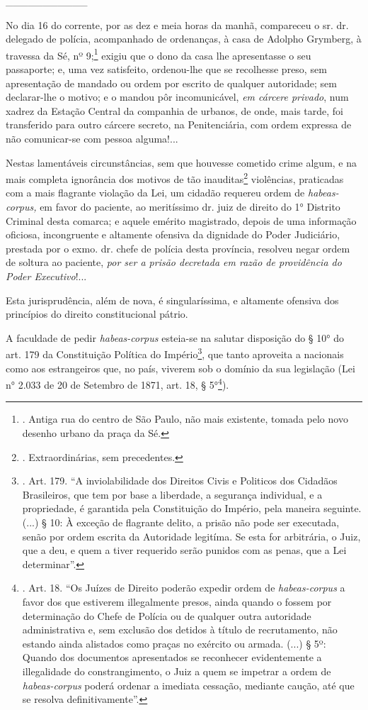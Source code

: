 \_\_\_\_\_\_\_\_\_\_\_

No dia 16 do corrente, por as dez e meia horas da manhã, compareceu o
sr. dr. delegado de polícia, acompanhado de ordenanças, à casa de
Adolpho Grymberg, à travessa da Sé, nº 9;\footnote{. Antiga rua do
  centro de São Paulo, não mais existente, tomada pelo novo desenho
  urbano da praça da Sé.} exigiu que o dono da casa lhe apresentasse o
seu passaporte; e, uma vez satisfeito, ordenou-lhe que se recolhesse
preso, sem apresentação de mandado ou ordem por escrito de qualquer
autoridade; sem declarar-lhe o motivo; e o mandou pôr incomunicável,
\emph{em cárcere privado}, num xadrez da Estação Central da companhia de
urbanos, de onde, mais tarde, foi transferido para outro cárcere
secreto, na Penitenciária, com ordem expressa de não comunicar-se com
pessoa alguma!...

Nestas lamentáveis circunstâncias, sem que houvesse cometido crime
algum, e na mais completa ignorância dos motivos de tão
inauditas\footnote{. Extraordinárias, sem precedentes.} violências,
praticadas com a mais flagrante violação da Lei, um cidadão requereu
ordem de \emph{habeas-corpus,} em favor do paciente, ao meritíssimo dr.
juiz de direito do 1° Distrito Criminal desta comarca; e aquele emérito
magistrado, depois de uma informação oficiosa, incongruente e altamente
ofensiva da dignidade do Poder Judiciário, prestada por o exmo. dr.
chefe de polícia desta província, resolveu negar ordem de soltura ao
paciente, \emph{por ser a prisão decretada em razão de providência do
Poder Executivo}!...

Esta jurisprudência, além de nova, é singularíssima, e altamente
ofensiva dos princípios do direito constitucional pátrio.

A faculdade de pedir \emph{habeas-corpus} esteia-se na salutar
disposição do § 10° do art. 179 da Constituição Política do
Império\footnote{. Art. 179. ``A inviolabilidade dos Direitos Civis e
  Politicos dos Cidadãos Brasileiros, que tem por base a liberdade, a
  segurança individual, e a propriedade, é garantida pela Constituição
  do Império, pela maneira seguinte. (...) § 10: À exceção de flagrante
  delito, a prisão não pode ser executada, senão por ordem escrita da
  Autoridade legitíma. Se esta for arbitrária, o Juiz, que a deu, e quem
  a tiver requerido serão punidos com as penas, que a Lei determinar''.},
que tanto aproveita a nacionais como aos estrangeiros que, no país,
viverem sob o domínio da sua legislação (Lei n° 2.033 de 20 de Setembro
de 1871, art. 18, § 5°\footnote{. Art. 18. ``Os Juízes de Direito
  poderão expedir ordem de \emph{habeas-corpus} a favor dos que
  estiverem illegalmente presos, ainda quando o fossem por determinação
  do Chefe de Polícia ou de qualquer outra autoridade administrativa e,
  sem exclusão dos detidos à título de recrutamento, não estando ainda
  alistados como praças no exército ou armada. (...) § 5º: Quando dos
  documentos apresentados se reconhecer evidentemente a illegalidade do
  constrangimento, o Juiz a quem se impetrar a ordem de
  \emph{habeas-corpus} poderá ordenar a imediata cessação, mediante
  caução, até que se resolva definitivamente''.}).

